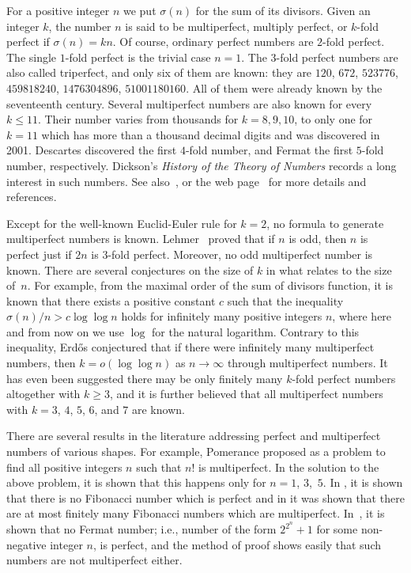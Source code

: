 \documentclass[twoside,amsthm]{elsart}
\begin{document}
For a positive integer $n$ we put $\sigma(n)$ for the sum of its
divisors. Given an integer $k$, the number $n$ is said to be
multiperfect, multiply perfect, or $k$-fold perfect if $\sigma(n) =
kn$. Of course, ordinary perfect numbers are $2$-fold perfect. The
single $1$-fold perfect is the trivial case $n=1$. The $3$-fold
perfect numbers are also called triperfect, and only six of them are
known: they are $120$, $672$, $523776$, $459818240$, $1476304896$, 
$51001180160$. All of them were already known by the seventeenth
century. Several multiperfect numbers are also known for every $k\le
11$. Their number varies from thousands for $k=8,9,10$, to only one
for $k=11$ which has more than a thousand decimal digits and was
discovered in 2001. Descartes discovered the first $4$-fold number,
and Fermat the first $5$-fold number, respectively. Dickson's
\textit{History of the Theory of Numbers} \cite[p.~33--38]{D}
records a long interest in such numbers. See
also~\cite[Section~B2]{Guy}, or the web page~\cite{njas} for more
details and references.

Except for the well-known Euclid-Euler rule for $k=2$, no formula to
generate multiperfect numbers is known.  Lehmer~\cite{Leh} proved
that if $n$ is odd, then $n$ is perfect just if $2n$ is $3$-fold
perfect. Moreover, no odd multiperfect number is known. There are
several conjectures on the size of $k$ in what relates to the size
of~$n$. For example, from the maximal order of the sum of divisors
function, it is known that there exists a positive constant $c$ such
that the inequality $\sigma(n)/n>c\log\log n$ holds for infinitely
many positive integers $n$, where here and from now on we use $\log
$ for the natural logarithm. Contrary to this inequality, Erd\H{o}s
conjectured that if there were infinitely many multiperfect numbers,
then $k = o(\log\log n)$ as $n\to\infty$ through multiperfect
numbers. It has even been suggested there may be only finitely many
$k$-fold perfect numbers altogether with $k \ge 3$, and it is
further believed that all multiperfect numbers with $k=3$, $4$, $5$,
$6$, and $7$ are known.

There are several results in the literature addressing perfect and
multiperfect numbers of various shapes. For example, Pomerance
\cite{Po} proposed as a problem to find all positive integers $n$ such
that $n!$ is multiperfect. In the solution \cite{Ev} to the above
problem, it is shown that this happens only for $n=1$, $3$,~$5$. In
\cite{Lu1}, it is shown that there is no Fibonacci number which is
perfect and in \cite{Lu3} it was shown that there are at most
finitely many Fibonacci numbers which are multiperfect.
In~\cite{Lu2}, it is shown that no Fermat number; i.e., number of
the form $2^{2^n}+1$ for some non-negative integer $n$, is perfect,
and the method of proof shows easily that such numbers are not
multiperfect either.
\end{document}
